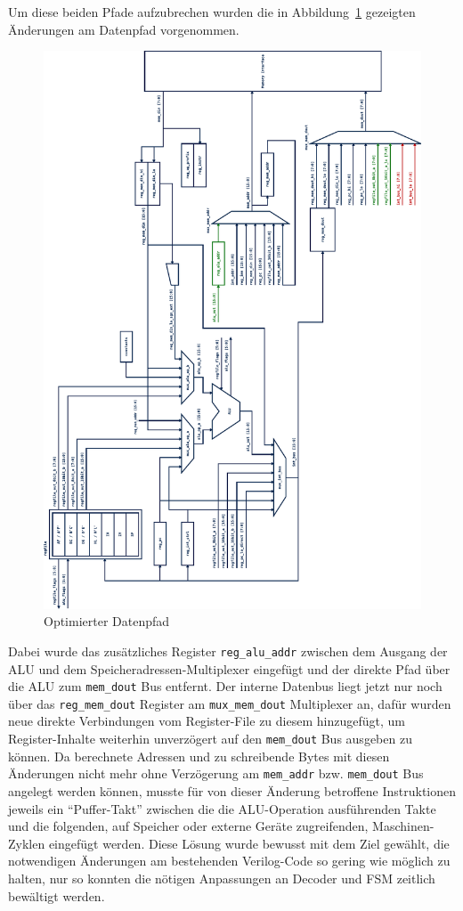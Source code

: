 \documentclass[ngerman, cd=lightcolor]{tudscrreprt}
\begin{document}
Um diese beiden Pfade aufzubrechen wurden die in
Abbildung~\ref{img:datapath-optimized} gezeigten Änderungen am Datenpfad
vorgenommen.

\begin{figure}[htbp]
  \centering
    \includegraphics[height=\textwidth,angle=-90]{resources/pdf/datapath-optimized.pdf}
  \caption{Optimierter Datenpfad}
  \label{img:datapath-optimized}
\end{figure}

\noindent
Dabei wurde das zusätzliches Register \texttt{reg\_alu\_addr} zwischen dem
Ausgang der ALU und dem Speicheradressen-Multiplexer eingefügt und der direkte
Pfad über die ALU zum \texttt{mem\_dout} Bus entfernt. Der interne Datenbus
liegt jetzt nur noch über das \texttt{reg\_mem\_dout} Register am
\texttt{mux\_mem\_dout} Multiplexer an, dafür wurden neue direkte Verbindungen
vom Register-File zu diesem hinzugefügt, um Register-Inhalte weiterhin
unverzögert auf den \texttt{mem\_dout} Bus ausgeben zu können.
Da berechnete Adressen und zu schreibende Bytes mit diesen Änderungen nicht
mehr ohne Verzögerung am \texttt{mem\_addr} bzw. \texttt{mem\_dout} Bus
angelegt werden können, musste für von dieser Änderung betroffene Instruktionen
jeweils ein ``Puffer-Takt'' zwischen die die ALU-Operation ausführenden Takte
und die folgenden, auf Speicher oder externe Geräte zugreifenden,
Maschinen-Zyklen eingefügt werden.
Diese Lösung wurde bewusst mit dem Ziel gewählt, die notwendigen Änderungen am
bestehenden Verilog-Code so gering wie möglich zu halten, nur so konnten
die nötigen Anpassungen an Decoder und FSM zeitlich bewältigt werden.
\end{document}
